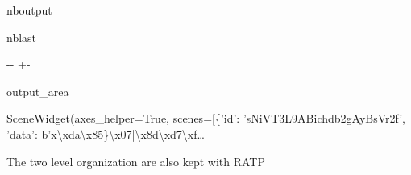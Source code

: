 \documentclass[letterpaper,10pt,english]{sphinxmanual}
\begin{document}
\begin{sphinxuseclass}{nboutput}
\begin{sphinxuseclass}{nblast}
{

\kern-\sphinxverbatimsmallskipamount\kern-\baselineskip
\kern+\FrameHeightAdjust\kern-\fboxrule
\vspace{\nbsphinxcodecellspacing}

\begin{sphinxuseclass}{output_area}
\begin{sphinxuseclass}{}


\begin{sphinxVerbatim}[commandchars=\\\{\}]
\llap{\color{nbsphinxout}[25]:\,\hspace{\fboxrule}\hspace{\fboxsep}}SceneWidget(axes\_helper=True, scenes=[\{'id': 'sNiVT3L9ABichdb2gAyBsVr2f', 'data': b'x\textbackslash{}xda\textbackslash{}x85\}\textbackslash{}x07|\textbackslash{}x8d\textbackslash{}xd7\textbackslash{}xf…
\end{sphinxVerbatim}



\end{sphinxuseclass}
\end{sphinxuseclass}
}

\end{sphinxuseclass}
\end{sphinxuseclass}
\sphinxAtStartPar
The two level organization are also kept with RATP
\end{document}
